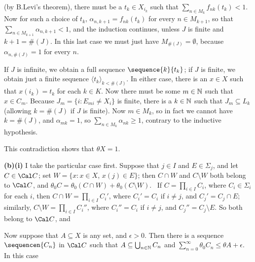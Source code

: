 {\noindent (by B.Levi's theorem), there must be a $t_k\in X_{i_k}$ such
that $\sum_{n\in M_k}f_{nk}(t_{k})<1$.   Now for such a choice of
$t_k$, $\alpha_{n,k+1}=f_{nk}(t_k)$ for every $n\in M_{k+1}$, so that
$\sum_{n\in M_{k+1}}\alpha_{n,k+1}<1$, and the induction continues,
unless $J$ is finite and $k+1=\#(J)$.   In this last case we must just
have $M_{\#(J)}=\emptyset$, because $\alpha_{n,\#(J)}=1$ for every $n$.

\medskip

 If $J$ is infinite, we obtain a full sequence
$\sequence{k}{t_k}$;  if $J$ is finite, we obtain just a finite sequence
$\langle t_k\rangle_{k<\#(J)}$.   In either case, there is an $x\in X$
such that $x(i_k)=t_k$ for each $k\in K$.   Now there must be some
$m\in\Bbb N$ such that $x\in C_m$.   Because $J_m=\{i:E_{mi}\ne X_i\}$
is finite, there is a $k\in\Bbb N$ such that $J_m\subseteq L_k$
(allowing $k=\#(J)$ if $J$ is finite).   Now $m\in M_k$, so in fact we
cannot have $k=\#(J)$, and
$\alpha_{mk}=1$, so $\sum_{n\in M_k}\alpha_{nk}\ge 1$, contrary to the
inductive hypothesis.\ \Bang

This contradiction shows that $\theta X=1$.

\medskip

{\bf (b)(i)} I take the particular case first.
Suppose that $j\in I$ and
$E\in\Sigma_j$, and let $C\in\Cal C$;  set $W=\{x:x\in X$, $x(j)\in
E\}$;
then $C\cap W$ and $C\setminus W$ both belong to $\Cal C$, and $\theta_0
C=\theta_0(C\cap W)+\theta_0(C\setminus W)$.   \Prf\ If
$C=\prod_{i\in I}C_i$, where $C_i\in\Sigma_i$ for each $i$, then
$C\cap W=\prod_{i\in I}C_i'$, where $C_i'=C_i$ if $i\ne j$, and
$C_j'=C_j\cap E$;  similarly,
$C\setminus W=\prod_{i\in I}C_i''$, where $C_i''=C_i$ if $i\ne j$, and
$C_j''=C_j\setminus E$.   So both belong to $\Cal C$, and


\medskip

 Now suppose that $A\subseteq X$ is any set, and
$\epsilon>0$.   Then there is a sequence $\sequencen{C_n}$ in $\Cal C$
such that $A\subseteq\bigcup_{n\in\Bbb N}C_n$ and
$\sum_{n=0}^{\infty}\theta_0C_n\le\theta A+\epsilon$.   In this case


}
